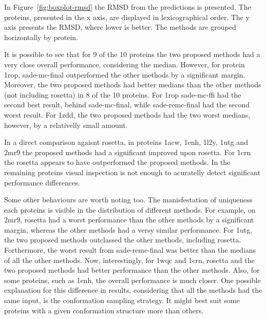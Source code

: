 In Figure~\ref{fig:boxplot-rmsd} the RMSD from the predictions is presented.
The proteins, presented in the x axis, are displayed in lexicographical order.
The y axis presents the RMSD, where lower is better. The methods are grouped
horizontally by protein.

It is possible to see that for 9 of the 10 proteins the
two proposed methods had a very close overall performance, considering the median.
However, for protein 1rop, sade-mc-final outperformed the other methods by a
significant margin. Moreover, the two proposed methods had better medians than
the other methods (not including rosetta) in 8 of the 10 proteins. For 1rop
sade-mc-ffi had the second best result, behind sade-mc-final, while sade-remc-final
had the second worst result. For 1zdd, the two proposed methods had the two worst
medians, however, by a relativelly small amount.

In a direct comparison agaisnt rosetta, in proteins 1acw, 1enh, 1l2y, 1utg and 2mr9
the proposed methods had a significant improved upon rosetta. For 1crn the rosetta
appears to have outperformed the proposed methods. In the remaining proteins visual
inspection is not enough to acuratelly detect significant performance differences.

Some other behaviours are worth noting too. The manisfestation of uniqueness each
proteins is visible in the distribution of different methods. For example, on
2mr9, rosetta had a worst performance than the other methods by a significant margin,
whereas the other methods had a versy similar performance. For 1utg, the two proposed
methods outclassed the other methods, including rosetta. Forthermore, the worst
result from sade-remc-final was better than the medians of all the other methods.
Now, interestingly, for 1wqc and 1crn, rosetta and the two proposed methods had
better performance than the other methods. Also, for some proteins, such as 1enh,
the overall performance is much closer. One possible explanation for this difference
in results, considering that all the methods had the same input, is the conformation
sampling strategy. It might best suit some proteins with a given conformation
structure more than others.


